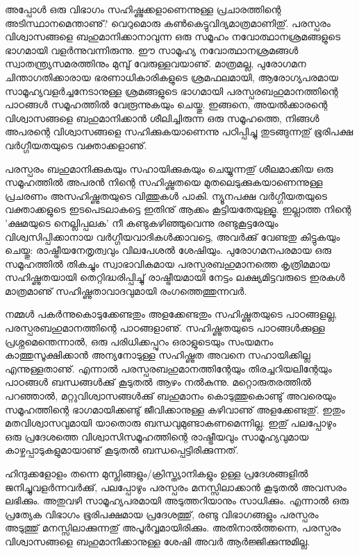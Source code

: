 അപ്പോള്‍ ഒരു വിഭാഗം സഹിഷ്ണുക്കളാണെന്നുള്ള പ്രചാരത്തിന്റെ അടിസ്ഥാനമെന്താണു്? വെറുമൊരു കണ്‍കെട്ടുവിദ്യമാത്രമാണിതു്. 
പരസ്പരം വിശ്വാസങ്ങളെ ബഹുമാനിക്കാനാവുന്ന ഒരു സമൂഹം നവോത്ഥാനശ്രമങ്ങളുടെ ഭാഗമായി വളര്‍ന്നുവന്നിരുന്നു. ഈ സാമൂഹ്യ 
നവോത്ഥാനശ്രമങ്ങള്‍ സ്വാതന്ത്ര്യസമരത്തിനും മുമ്പു് വേരുള്ളവയാണു്. മാത്രമല്ല, പുരോഗമന ചിന്താഗതിക്കാരായ ഭരണാധികാരികളുടെ
 ശ്രമഫലമായി, ആരോഗ്യപരമായ സാമൂഹ്യവളര്‍ച്ചനേടാനുള്ള ശ്രമങ്ങളുടെ ഭാഗമായി പരസ്പരബഹുമാനത്തിന്റെ പാഠങ്ങള്‍ സമൂഹത്തില്‍ 
 വേരൂന്നുകയും ചെയ്തു. ഇങ്ങനെ, അയല്‍ക്കാരന്റെ വിശ്വാസങ്ങളെ ബഹുമാനിക്കാന്‍ ശീലിച്ചിരുന്ന ഒരു സമൂഹത്തെ, നിങ്ങള്‍ 
 അപരന്റെ വിശ്വാസങ്ങളെ സഹിക്കുകയാണെന്നു പഠിപ്പിച്ചു തുടങ്ങുന്നതു് ഭൂരിപക്ഷ വര്‍ഗ്ഗീയതയുടെ വക്താക്കളാണു്.

പരസ്പരം ബഹുമാനിക്കുകയും സഹായിക്കുകയും ചെയ്യുന്നതു് ശീലമാക്കിയ ഒരു സമൂഹത്തില്‍ അപരന്‍ നിന്റെ സഹിഷ്ണുതയെ 
മുതലെടുക്കുകയാണെന്നുള്ള പ്രചരണം അസഹിഷ്ണുതയുടെ വിത്തുകള്‍ പാകി. ന്യൂനപക്ഷ വര്‍ഗ്ഗീയതയുടെ വക്താക്കളുടെ ഇടപെടലാകട്ടെ 
ഇതിനു് ആക്കം കൂട്ടിയതേയുള്ളൂ. ഇല്ലാത്ത നിന്റെ 'ക്ഷമയുടെ നെല്ലിപ്പലക' നീ കണ്ടുകഴിഞ്ഞുവെന്നു രണ്ടുകൂട്ടരേയും വിശ്വസിപ്പിക്കാനായ
 വര്‍ഗ്ഗീയവാദികള്‍ക്കാവട്ടെ, അവര്‍ക്കു് വേണ്ടതു കിട്ടുകയും ചെയ്തു: രാഷ്ട്രീയനേതൃത്വവും വിലപേശല്‍ ശേഷിയും. പുരോഗമനപരമായ
  ഒരു സമൂഹത്തില്‍ തികച്ചും സ്വാഭാവികമായ പരസ്പരബഹുമാനത്തെ കൃത്രിമമായ സഹിഷ്ണുതയായി തെറ്റിദ്ധരിപ്പിച്ചു് രാഷ്ട്രീയമായി 
  നേട്ടം ലക്ഷ്യമിട്ടവരുടെ ഇരകള്‍ മാത്രമാണു് സഹിഷ്ണുതാവാദവുമായി രംഗത്തെത്തുന്നവര്‍.

നമ്മള്‍ പകര്‍ന്നുകൊടുക്കേണ്ടതും അളക്കേണ്ടതും സഹിഷ്ണുതയുടെ പാഠങ്ങളല്ല, പരസ്പരബഹുമാനത്തിന്റെ പാഠങ്ങളാണു്. സഹിഷ്ണുതയുടെ 
പാഠങ്ങള്‍ക്കുള്ള പ്രശ്നമെന്തെന്നാല്‍, ഒരു പരിധിക്കപ്പുറം ഒരാളുടെയും സംയമനം കാത്തുസൂക്ഷിക്കാന്‍ അന്യനോടുള്ള സഹിഷ്ണുത 
അവനെ സഹായിക്കില്ല എന്നുള്ളതാണു്. എന്നാല്‍ പരസ്പരബഹുമാനത്തിന്റേയും തിരച്ചറിയലിന്റേയും പാഠങ്ങള്‍ ബന്ധങ്ങള്‍ക്കു് കൂടുതല്‍ ആഴം നല്‍കുന്നു. മറ്റൊരുതരത്തില്‍ പറഞ്ഞാല്‍, മറ്റുവിശ്വാസങ്ങള്‍ക്കു്  ബഹുമാനം കൊടുത്തുകൊണ്ടു് അവരെയും സമൂഹത്തിന്റെ 
ഭാഗമായിക്കണ്ടു് ജീവിക്കാനുള്ള കഴിവാണു് അളക്കേണ്ടതു്. ഇതും മതവിശ്വാസവുമായി യാതൊരു ബന്ധവുമുണ്ടാകണമെന്നില്ല. ഇതു് 
പലപ്പോഴും ഒരു പ്രദേശത്തെ വിശ്വാസിസമൂഹത്തിന്റെ രാഷ്ട്രീയവും സാമൂഹ്യവുമായ കാഴ്ചപ്പാടുകളുമായാണു് കൂടുതല്‍ ബന്ധപ്പെട്ടിരിക്കുന്നത്.

ഹിന്ദുക്കളോളം തന്നെ മുസ്ലിങ്ങളും/ക്രിസ്ത്യാനികളും ഉള്ള പ്രദേശങ്ങളില്‍ ജനിച്ചുവളര്‍ന്നവര്‍ക്കു്, പലപ്പോഴും പരസ്പരം മനസ്സിലാക്കാന്‍ 
കൂടുതല്‍ അവസരം ലഭിക്കും. അതുവഴി സാമൂഹ്യപരമായി അടുത്തറിയാനും സാധിക്കും. എന്നാല്‍ ഒരു പ്രത്യേക വിഭാഗം ഭൂരിപക്ഷമായ
 പ്രദേശത്തു്, രണ്ടു വിഭാഗങ്ങളും പരസ്പരം അടുത്തു് മനസ്സിലാക്കുന്നതു് അപൂര്‍വ്വമായിരിക്കും. അതിനാല്‍ത്തന്നെ, പരസ്പരം വിശ്വാസങ്ങളെ
  ബഹുമാനിക്കാനുള്ള ശേഷി അവര്‍ ആര്‍ജ്ജിക്കുന്നുമില്ല.

